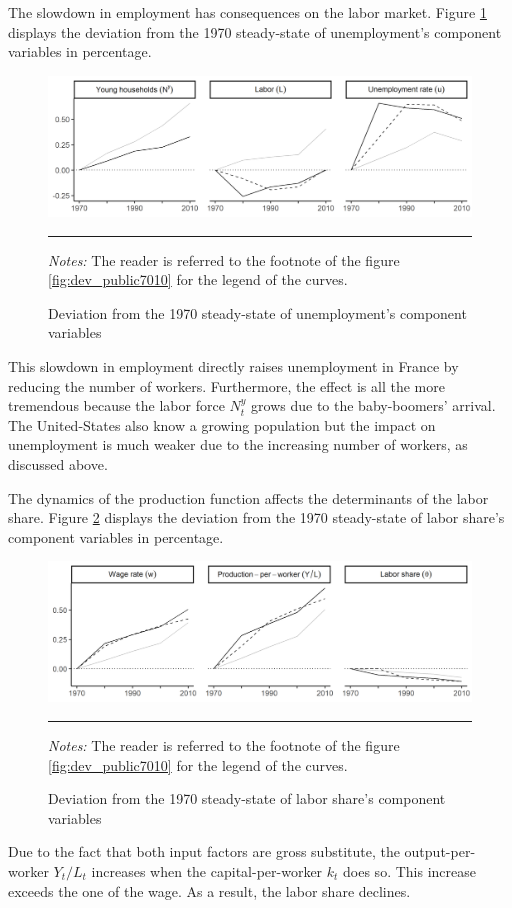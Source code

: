The slowdown in employment has consequences on the labor market. Figure \ref{fig:dev_unemp7010} displays the deviation from the 1970 steady-state of unemployment's component variables in percentage.
\begin{figure}[tb]
	\centering
	\includegraphics[width=1\linewidth]{../result/deviation/dev_unemp7010.png}
	\caption{Deviation from the 1970 steady-state of unemployment's component variables}
	\label{fig:dev_unemp7010}
	\vspace{.5ex}
	\hrule
	\vspace{-4ex}
	\justify\singlespacing\footnotesize \textit{Notes:} The reader is referred to the footnote of the figure \ref{fig:dev_public7010} for the legend of the curves.
\end{figure}
This slowdown in employment directly raises unemployment in France by reducing the number of workers. Furthermore, the effect is all the more tremendous because the labor force $N_t^y$ grows due to the baby-boomers' arrival. The United-States also know a growing population but the impact on unemployment is much weaker due to the increasing number of workers, as discussed above.

The dynamics of the production function affects the determinants of the labor share. Figure \ref{fig:dev_laborshare7010} displays the deviation from the 1970 steady-state of labor share's component variables in percentage.
\begin{figure}[tb]
	\centering
	\includegraphics[width=1\linewidth]{../result/deviation/dev_laborshare7010.png}
	\caption{Deviation from the 1970 steady-state of labor share's component variables}
	\label{fig:dev_laborshare7010}
	\vspace{.5ex}
	\hrule
	\vspace{-4ex}
	\justify\singlespacing\footnotesize \textit{Notes:} The reader is referred to the footnote of the figure \ref{fig:dev_public7010} for the legend of the curves.
\end{figure}
Due to the fact that both input factors are gross substitute, the output-per-worker $Y_t/L_t$ increases when the capital-per-worker $k_t$ does so. This increase exceeds the one of the wage. As a result, the labor share declines.

